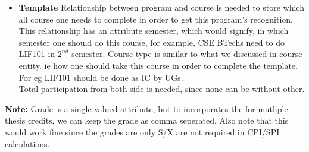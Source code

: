 \documentclass[a4paper]{article}
\begin{document}
\begin{itemize}
	\item{\textbf{Template}} Relationship between program and course is needed to store which all course one
	needs to complete in order to get this program's recognition. This relationship has an attribute semester,
	which would signify, in which semester one should do this course, for example, CSE BTechs need to do LIF101
	in $2^{nd}$ semester. Course type is similar to what we discussed in course entity. ie how one should take this
	course in order to complete the template. For eg LIF101 should be done as IC by UGs. \\
	Total participation from both side is needed, since none can be without other.
\end{itemize}

\textbf{Note:} Grade is a single valued attribute, but to incorporates the for mutliple thesis credits, we can keep the grade as comma seperated. Also note that this would work fine since the grades are only S/X are not required in CPI/SPI calculations.

\pagebreak
\end{document}
